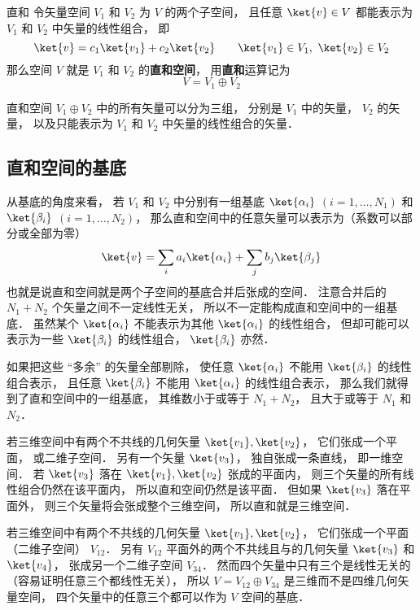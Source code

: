 
\begin{definition}{直和}
令矢量空间 $V_1$ 和 $V_2$ 为 $V$ 的两个子空间， 且任意 $\ket{v} \in V$ 都能表示为 $V_1$ 和 $V_2$ 中矢量的线性组合， 即
\begin{equation}
\ket{v} = c_1 \ket{v_1} + c_2 \ket{v_2}
\qquad
\ket{v_1} \in V_1,\ \ket{v_2} \in V_2
\end{equation}
那么空间 $V$ 就是 $V_1$ 和 $V_2$ 的\textbf{直和空间}， 用\textbf{直和}运算记为
\begin{equation}
V = V_1 \oplus V_2
\end{equation}
\end{definition}

直和空间 $V_1 \oplus V_2$ 中的所有矢量可以分为三组， 分别是 $V_1$ 中的矢量， $V_2$ 的矢量， 以及只能表示为 $V_1$ 和 $V_2$ 中矢量的线性组合的矢量．

\subsection{直和空间的基底}
从基底的角度来看， 若 $V_1$ 和 $V_2$ 中分别有一组基底 $\ket{\alpha_i}$ $(i = 1, \dots, N_1)$ 和 $\ket{\beta_i}$ $(i = 1, \dots, N_2)$， 那么直和空间中的任意矢量可以表示为（系数可以部分或全部为零）
\begin{equation}
\ket{v} = \sum_i a_i \ket{\alpha_i} + \sum_j b_j \ket{\beta_j}
\end{equation}
也就是说直和空间就是两个子空间的基底合并后张成的空间． 注意合并后的 $N_1 + N_2$ 个矢量之间不一定线性无关， 所以不一定能构成直和空间中的一组基底． 虽然某个 $\ket{\alpha_i}$ 不能表示为其他 $\ket{\alpha_i}$ 的线性组合， 但却可能可以表示为一些 $\ket{\beta_i}$ 的线性组合， $\ket{\beta_i}$ 亦然．

如果把这些 “多余” 的矢量全部剔除， 使任意 $\ket{\alpha_i}$ 不能用 $\ket{\beta_i}$ 的线性组合表示， 且任意 $\ket{\beta_i}$ 不能用 $\ket{\alpha_i}$ 的线性组合表示， 那么我们就得到了直和空间中的一组基底， 其维数小于或等于 $N_1 + N_2$， 且大于或等于 $N_1$ 和 $N_2$．

\begin{example}{}\label{DirSum_ex1}
若三维空间中有两个不共线的几何矢量 $\ket{v_1}, \ket{v_2}$， 它们张成一个平面， 或二维子空间． 另有一个矢量 $\ket{v_3}$， 独自张成一条直线， 即一维空间． 若 $\ket{v_3}$ 落在 $\ket{v_1}, \ket{v_2}$ 张成的平面内， 则三个矢量的所有线性组合仍然在该平面内， 所以直和空间仍然是该平面． 但如果 $\ket{v_3}$ 落在平面外， 则三个矢量将会张成整个三维空间， 所以直和就是三维空间．
\end{example}

\begin{example}{}\label{DirSum_ex2}
若三维空间中有两个不共线的几何矢量 $\ket{v_1}, \ket{v_2}$， 它们张成一个平面（二维子空间） $V_{12}$． 另有 $V_{12}$ 平面外的两个不共线且与的几何矢量 $\ket{v_3}$ 和 $\ket{v_4}$， 张成另一个二维子空间 $V_{34}$． 然而四个矢量中只有三个是线性无关的（容易证明任意三个都线性无关）， 所以 $V = V_{12} \oplus V_{34}$ 是三维而不是四维几何矢量空间， 四个矢量中的任意三个都可以作为 $V$ 空间的基底．
\end{example}
